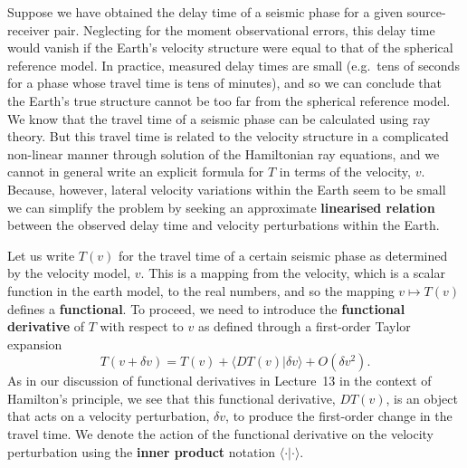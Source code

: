 Suppose we have obtained the delay time of a seismic phase for a given source-receiver pair. Neglecting for the moment 
observational errors, this delay time would vanish if the Earth's velocity structure were equal to that of the spherical 
reference model. In practice, measured delay times are small (e.g.\ tens of seconds for a phase whose travel time is tens 
of minutes), and so we can conclude that the Earth's true structure cannot be too far from the spherical reference model. 
We know that the travel time of a seismic phase can be calculated using ray theory. But this travel time is related to 
the velocity structure in a complicated non-linear manner through solution of the Hamiltonian ray equations, and we 
cannot in general write an explicit formula for $T$ in terms of the velocity, $v$. Because, however, lateral velocity 
variations within the Earth seem to be small we can simplify the problem by seeking an approximate \textbf{linearised relation}
between the observed delay time and velocity perturbations within the Earth. 

Let us write $T(v)$ for the travel time of a certain seismic phase as determined by the velocity model, $v$. This 
is a mapping from the velocity, which is a scalar function in the earth model, to the real numbers, and so the 
mapping $v\mapsto T(v)$ defines a
\textbf{functional}. To proceed, we need to introduce the 
\textbf{functional derivative} of  $T$ with respect to $v$ as defined through a first-order Taylor expansion
\begin{equation}
    T(v+\delta v) = T(v) + \langle DT(v)|\delta v \rangle + O(\delta v^{2}).
    \label{eq:2}
\end{equation}
As in our discussion of functional derivatives in Lecture~13 in the context of Hamilton's principle, we see that this 
functional derivative, $DT(v)$, is an object that acts on a velocity perturbation, $\delta v$, to produce the first-order 
change in the travel time. We denote the action of the functional derivative on the velocity perturbation using the \textbf{inner 
product} notation $\langle \cdot | \cdot \rangle$. 

